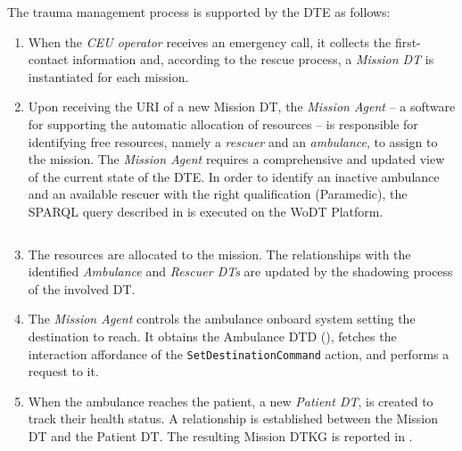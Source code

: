The trauma management process is supported by the \ac{DTE} as follows:
\begin{enumerate}
    \item When the \emph{CEU operator} receives an emergency call, it collects the first-contact information and, according to the rescue process, a \emph{Mission \ac{DT}} is instantiated for each mission.
    \item Upon receiving the \ac{URI} of a new Mission \ac{DT}, the \emph{Mission Agent} -- a software for supporting the automatic allocation of resources -- is responsible for identifying free resources, namely a \emph{rescuer} and an \emph{ambulance}, to assign to the mission. The \emph{Mission Agent} requires a comprehensive and updated view of the current state of the \ac{DTE}. In order to identify an inactive ambulance and an available rescuer with the right qualification (Paramedic), the SPARQL query described in  is executed on the \ac{WoDT} Platform. 

    \begin{code}
    \label{lst:ambulance-rescuer-query}
    \inputminted{sparql}{listings/hwodt/use-case/ambulance-rescuer-query.rq}
    \end{code}
    
    \item The resources are allocated to the mission. The relationships with the identified \emph{Ambulance} and \emph{Rescuer \acp{DT}} are updated by the shadowing process of the involved \ac{DT}.
    \item The \emph{Mission Agent} controls the ambulance onboard system setting the destination to reach. It obtains the Ambulance \ac{DTD} (), fetches the interaction affordance of the \texttt{SetDestinationCommand} action, and performs a request to it.

        


    \item When the ambulance reaches the patient, a new \emph{Patient \ac{DT}}, is created to track their health status. A relationship is established between the Mission \ac{DT} and the Patient \ac{DT}. The resulting Mission \ac{DTKG} is reported in .


\end{enumerate}
